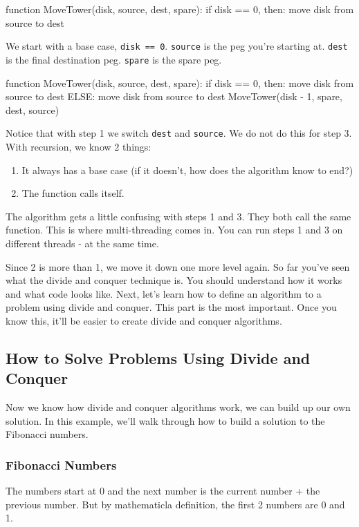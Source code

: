 \documentclass{article}
\newcommand{\code}[1]{\texttt{#1}}
\begin{document}
		\begin{codebox}
\li function MoveTower(disk, source, dest, spare): \Do
    \li if disk == 0, then: \Do
    \li move disk from source to dest
    \End
\end{codebox}
We start with a base case, \code{disk == 0}. \code{source} is the peg you're starting at. \code{dest} is the final destination peg. \code{spare} is the spare peg. 
		\begin{codebox}
\li function MoveTower(disk, source, dest, spare): \Do
    \li if disk == 0, then: \Do
    \li move disk from source to dest \End
\li ELSE: \Do
\li move disk from source to dest 
\li MoveTower(disk - 1, spare, dest, source) \End
    \End
\end{codebox}
Notice that with step 1 we switch \code{dest} and \code{source}. We do not do this for step 3. 
With recursion, we know 2 things:
\begin{enumerate}
    \item It always has a base case (if it doesn't, how does the algorithm know to end?)
    \item The function calls itself.
\end{enumerate}
The algorithm gets a little confusing with steps 1 and 3. They both call the same function. This is where multi-threading comes in. You can run steps 1 and 3 on different threads - at the same time. 

Since 2 is more than 1, we move it down one more level again. So far you've seen what the divide and conquer technique is. You should understand how it works and what code looks like. Next, let's learn how to define an algorithm to a problem using divide and conquer. This part is the most important. Once you know this, it'll be easier to create divide and conquer algorithms.

\subsection{How to Solve Problems Using Divide and Conquer}
Now we know how divide and conquer algorithms work, we can build up our own solution. In this example, we'll walk through how to build a solution to the Fibonacci numbers.
\subsubsection{Fibonacci Numbers}

The numbers start at 0 and the next number is the current number + the previous number. But by mathematicla definition, the first 2 numbers are 0 and 1.
\end{document}
